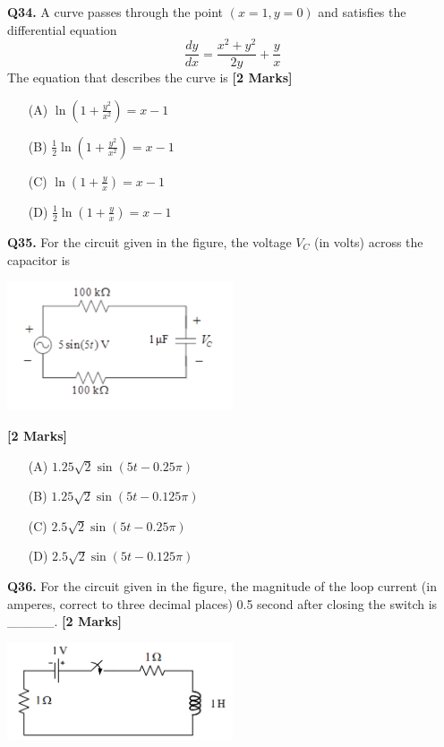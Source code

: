 \documentclass[11pt]{article}
\newcommand{\questionb}[2]{
    \noindent\textbf{Q#2.} #1 \hfill \textbf{[2 Marks]}
}
\begin{document}
\vspace{0.5cm}

\questionb{A curve passes through the point $(x = 1, y = 0)$ and satisfies the differential equation
\[
\frac{dy}{dx} = \frac{x^2 + y^2}{2y} + \frac{y}{x}
\]
The equation that describes the curve is}{34}
\begin{enumerate}
    \item[(A)] $\ln\left(1 + \frac{y^2}{x^2}\right) = x - 1$
    \item[(B)] $\frac{1}{2}\ln\left(1 + \frac{y^2}{x^2}\right) = x - 1$
    \item[(C)] $\ln\left(1 + \frac{y}{x}\right) = x - 1$
    \item[(D)] $\frac{1}{2}\ln\left(1 + \frac{y}{x}\right) = x - 1$
\end{enumerate}

\vspace{0.5cm}

\questionb{For the circuit given in the figure, the voltage $V_C$ (in volts) across the capacitor is

\begin{center}
\includegraphics[width=0.5\textwidth]{figures/35.png}
\end{center}}{35}
\begin{enumerate}
    \item[(A)] $1.25\sqrt{2}\sin(5t - 0.25\pi)$
    \item[(B)] $1.25\sqrt{2}\sin(5t - 0.125\pi)$
    \item[(C)] $2.5\sqrt{2}\sin(5t - 0.25\pi)$
    \item[(D)] $2.5\sqrt{2}\sin(5t - 0.125\pi)$
\end{enumerate}

\vspace{0.5cm}

\questionb{For the circuit given in the figure, the magnitude of the loop current (in amperes, correct to three decimal places) 0.5 second after closing the switch is \_\_\_\_\_.}{36}

\begin{center}
\includegraphics[width=0.5\textwidth]{figures/36.png}
\end{center}
\end{document}
